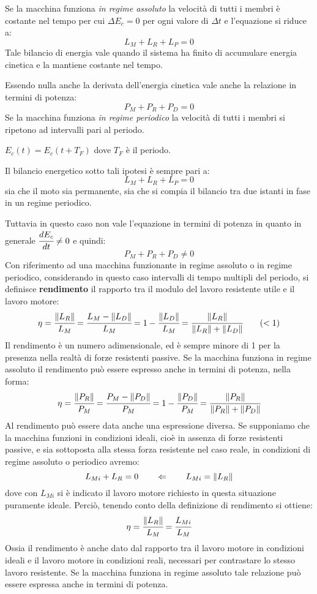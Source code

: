 	Se la macchina funziona \emph{in regime assoluto} la velocità di tutti i membri è costante nel tempo per cui $\Delta E_c = 0$ per ogni valore di $\Delta t$ e l'equazione si riduce a:
	\[L_M + L_R + L_P = 0\]
	Tale bilancio di energia vale quando il sistema ha finito di accumulare energia cinetica e la mantiene costante nel tempo.
	
	Essendo nulla anche la derivata dell'energia cinetica vale anche la relazione in termini di potenza:
	\[
	P_M + P_R + P_D = 0
	\]
	Se la macchina funziona \emph{in regime periodico} la velocità di tutti i membri si ripetono ad intervalli pari al periodo.
	
	$E_c(t) = E_c(t+T_F)$ dove $T_F$ è il periodo.
	
	Il bilancio energetico sotto tali ipotesi è sempre pari a:
	\[L_M + L_R + L_P = 0\]
	sia che il moto sia permanente, sia che si compia il bilancio tra due istanti in fase in un regime periodico.
	
	Tuttavia in questo caso non vale l'equazione in termini di potenza in quanto in generale $\cfrac{dE_c}{dt}\ne0$ e quindi:
	\[P_M + P_R + P_D \ne 0\]
	Con riferimento ad una macchina funzionante in regime assoluto o in regime periodico, considerando in questo caso intervalli di tempo multipli del periodo, si definisce \textbf{rendimento} il rapporto tra il modulo del lavoro resistente utile e il lavoro motore:
	\[
	\eta = \cfrac{\lVert L_R\rVert}{L_M} = \cfrac{L_M - \lVert L_D\rVert}{L_M} = 1 - \cfrac{\lVert L_D\rVert}{L_M} = \cfrac{\lVert L_R\rVert}{\lVert L_R\rVert+\lVert L_D\rVert}  \qquad(<1)
	\]
	Il rendimento è un numero adimensionale, ed è sempre minore di 1 per la presenza nella realtà di forze resistenti passive. Se la macchina funziona in regime assoluto il rendimento può essere espresso anche in termini di potenza, nella forma:
	\[
	\eta = \cfrac{\lVert P_R\rVert}{P_M} = \cfrac{P_M - \lVert P_D\rVert}{P_M} = 1 - \cfrac{\lVert P_D\rVert}{P_M} = \cfrac{\lVert P_R\rVert}{\lVert P_R\rVert + \lVert P_D\rVert}
	\]
	Al rendimento può essere data anche una espressione diversa. Se supponiamo che la macchina funzioni in condizioni ideali, cioè in assenza di forze resistenti passive, e sia sottoposta alla stessa forza resistente nel caso reale, in condizioni di regime assoluto o periodico avremo:
	\[
	L_{Mi} + L_{R} = 0\qquad\Leftarrow\qquad L_{Mi} = \lVert L_R\rVert
	\]
	dove con $L_{Mi}$ si è indicato il lavoro motore richiesto in questa situazione puramente ideale. Perciò, tenendo conto della definizione di rendimento si ottiene:
	\[
	\eta = \cfrac{\lVert L_R\rVert}{L_M} = \cfrac{L_{Mi}}{L_M}
	\]
	Ossia il rendimento è anche dato dal rapporto tra il lavoro motore in condizioni ideali e il lavoro motore in condizioni reali, necessari per contrastare lo stesso lavoro resistente. Se la macchina funziona in regime assoluto tale relazione può essere espressa anche in termini di potenza.
	
